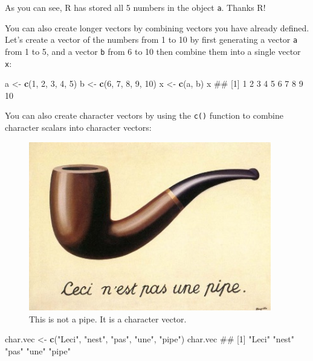 \documentclass[]{book}
\newenvironment{Shaded}{\begin{snugshade}}{\end{snugshade}}
\newcommand{\KeywordTok}[1]{\textcolor[rgb]{0.13,0.29,0.53}{\textbf{{#1}}}}
\newcommand{\DecValTok}[1]{\textcolor[rgb]{0.00,0.00,0.81}{{#1}}}
\newcommand{\StringTok}[1]{\textcolor[rgb]{0.31,0.60,0.02}{{#1}}}
\newcommand{\NormalTok}[1]{{#1}}
\theoremstyle{definition}
\theoremstyle{definition}
\theoremstyle{remark}
\begin{document}
As you can see, R has stored all 5 numbers in the object \texttt{a}.
Thanks R!

You can also create longer vectors by combining vectors you have already
defined. Let's create a vector of the numbers from 1 to 10 by first
generating a vector \texttt{a} from 1 to 5, and a vector \texttt{b} from
6 to 10 then combine them into a single vector \texttt{x}:

\begin{Shaded}
\begin{Highlighting}[]
\NormalTok{a <-}\StringTok{ }\KeywordTok{c}\NormalTok{(}\DecValTok{1}\NormalTok{, }\DecValTok{2}\NormalTok{, }\DecValTok{3}\NormalTok{, }\DecValTok{4}\NormalTok{, }\DecValTok{5}\NormalTok{)}
\NormalTok{b <-}\StringTok{ }\KeywordTok{c}\NormalTok{(}\DecValTok{6}\NormalTok{, }\DecValTok{7}\NormalTok{, }\DecValTok{8}\NormalTok{, }\DecValTok{9}\NormalTok{, }\DecValTok{10}\NormalTok{)}
\NormalTok{x <-}\StringTok{ }\KeywordTok{c}\NormalTok{(a, b)}
\NormalTok{x}
\NormalTok{##  [1]  1  2  3  4  5  6  7  8  9 10}
\end{Highlighting}
\end{Shaded}

You can also create character vectors by using the \texttt{c()} function
to combine character scalars into character vectors:

\begin{figure}

{\centering \includegraphics[width=400px]{images/magrittepipe} 

}

\caption{This is not a pipe. It is a character vector.}\label{fig:unnamed-chunk-70}
\end{figure}

\begin{Shaded}
\begin{Highlighting}[]
\NormalTok{char.vec <-}\StringTok{ }\KeywordTok{c}\NormalTok{(}\StringTok{"Leci"}\NormalTok{, }\StringTok{"nest"}\NormalTok{, }\StringTok{"pas"}\NormalTok{, }\StringTok{"une"}\NormalTok{, }\StringTok{"pipe"}\NormalTok{)}
\NormalTok{char.vec}
\NormalTok{## [1] "Leci" "nest" "pas"  "une"  "pipe"}
\end{Highlighting}
\end{Shaded}
\end{document}

